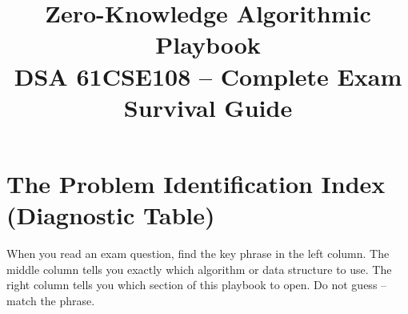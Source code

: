 \documentclass[12pt,portrait]{article}
\begin{document}
\title{\Huge \textbf{Zero-Knowledge Algorithmic Playbook}\\[8pt]
\large DSA 61CSE108 -- Complete Exam Survival Guide}
\author{}
\date{}
\maketitle

\tableofcontents
\newpage


\section{The Problem Identification Index (Diagnostic Table)}

\begin{warningbox}
When you read an exam question, find the key phrase in the left column. The middle column tells you exactly which algorithm or data structure to use. The right column tells you which section of this playbook to open. Do not guess -- match the phrase.
\end{warningbox}
\end{document}
